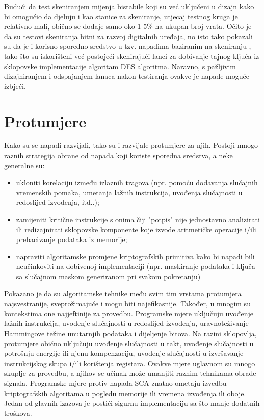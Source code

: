 \documentclass[times, utf8, diplomski]{fer}
\begin{document}
Budući da test skeniranjem mijenja bistabile koji su već uključeni u dizajn kako bi omogućio da djeluju i kao stanice za skeniranje, utjecaj testnog kruga je relativno mali, obično se dodaje samo oko 1-5\% na ukupan broj vrata. \citep{semiconductorengineering_2019}
Očito je da su testovi skeniranja bitni za razvoj digitalnih uređaja, no isto tako \cite{yang2004scan} pokazali su da je i korisno sporedno sredstvo u tzv. napadima baziranim na skeniranju , tako što su iskorišteni već postojeći skenirajući lanci za dobivanje tajnog ključa iz sklopovske implementacije algoritam DES algoritma. Naravno, s pažljivim dizajniranjem i odspajanjem lanaca nakon testiranja ovakve je napade moguće izbjeći.

\section{Protumjere}

Kako su se napadi razvijali, tako su i razvijale protumjere za njih. Postoji mnogo raznih strategija obrane od napada koji koriste sporedna sredstva, a neke generalne su:
\begin{itemize}
    \item ukloniti korelaciju između izlaznih tragova (npr. pomoću dodavanja slučajnih vremenskih pomaka, umetanja lažnih instrukcija, uvođenja slučajnosti u redoslijed izvođenja, itd..);
    \item zamijeniti kritične instrukcije s onima čiji "potpis" nije jednostavno analizirati ili redizajnirati sklopovske komponente koje izvode aritmetičke operacije i/ili prebacivanje podataka iz memorije;
    \item napraviti algoritamske promjene kriptografskih primitiva kako bi napadi bili neučinkoviti na dobivenoj implementaciji (npr. maskiranje podataka i ključa sa slučajnom maskom generiranom pri svakom pokretanju)
\end{itemize}

Pokazano je da su algoritamske tehnike među svim tim vrstama protumjera najsvestranije, sveprožimajuće i mogu biti najefikasnije. Također, u mnogim su kontekstima one najjeftinije za provedbu. Programske mjere uključuju uvođenje lažnih instrukcija, uvođenje slučajnosti u redoslijed izvođenja, uravnoteživanje Hammingove težine unutarnjih podataka i dijeljenje bitova. Na razini sklopovlja, protumjere obično uključuju uvođenje slučajnosti u takt, uvođenje slučajnosti u potrošnju energije ili njenu kompenzaciju, uvođenje slučajnosti u izvršavanje instrukcijskog skupa i/ili korištenja registara. Ovakve mjere uglavnom su mnogo skuplje za provedbu, a njihov se učinak može umanjiti raznim tehnikama obrade signala. Programske mjere protiv napada SCA znatno ometaju izvedbu kriptografskih algoritama u pogledu memorije ili vremena izvođenja ili oboje. Jedan od glavnih izazova je postići sigurnu implementaciju sa što manje dodatnih troškova.
\end{document}
